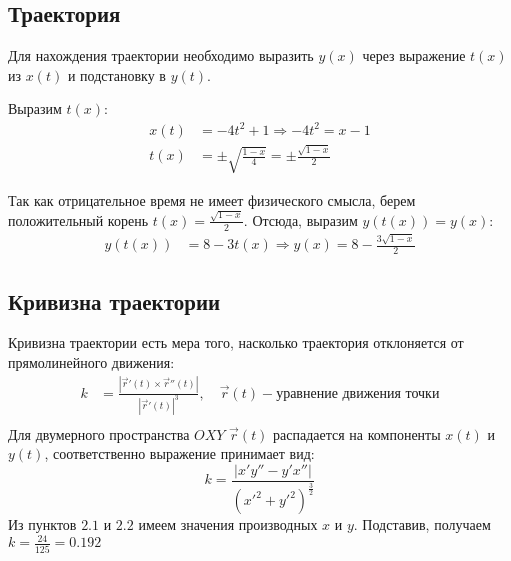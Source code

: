 \subsection{Траектория}
Для нахождения траектории необходимо выразить $y(x)$ через
выражение $t(x)$ из $x(t)$ и подстановку в $y(t)$.

Выразим $t(x)$:\\
\begin{align}
    x(t) &= -4t^{2} + 1 \Rightarrow -4t^{2} = x - 1 \\
    t(x) &= \pm\sqrt{\frac{1-x}{4}} = \pm\frac{\sqrt{1 - x}}{2}
\end{align}

Так как отрицательное время не имеет физического смысла, берем
положительный корень $t(x) = \frac{\sqrt{1 - x}}{2}$.
Отсюда, выразим $y(t(x)) = y(x)$:\\
\begin{align}
    y(t(x)) &= 8 - 3t(x) \Rightarrow
    y(x) = 8 - \frac{3\sqrt{1 - x}}{2}
\end{align}

\begin{figure}[ht]
    \centering
\end{figure}

\subsection{Кривизна траектории}
Кривизна траектории есть мера того, насколько траектория отклоняется от
прямолинейного движения:
\begin{align}
    k &= \frac{\left|\vec{r}'(t)\times\vec{r}''(t)\right|}{\left|\vec{r}'(t)\right|^{3}},
    \quad\vec{r}(t) - \text{уравнение движения точки}\\
\end{align}
Для двумерного пространства $OXY$ $\vec{r}(t)$ распадается на компоненты $x(t)$ и $y(t)$,
соответственно выражение принимает вид:
$$k = \frac{\left|x'y'' - y'x''\right|}{(x'^{2}+y'^{2})^{\frac{3}{2}}}$$
Из пунктов $2.1$ и $2.2$ имеем значения производных $x$ и $y$.
Подставив, получаем $k = \frac{24}{125} = 0.192$
